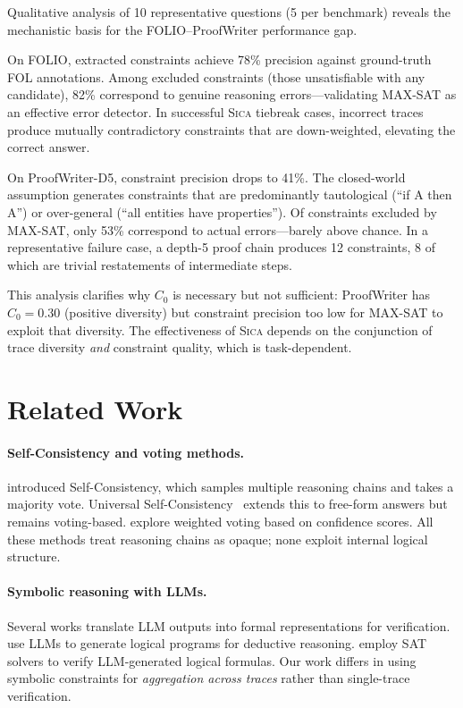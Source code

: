 \documentclass[11pt,a4paper]{article}
\newcommand{\sica}{\textsc{Sica}}
\begin{document}
Qualitative analysis of 10 representative questions (5 per benchmark) reveals the mechanistic basis for the FOLIO--ProofWriter performance gap.

On FOLIO, extracted constraints achieve 78\% precision against ground-truth FOL annotations.
Among excluded constraints (those unsatisfiable with any candidate), 82\% correspond to genuine reasoning errors---validating MAX-SAT as an effective error detector.
In successful \sica{} tiebreak cases, incorrect traces produce mutually contradictory constraints that are down-weighted, elevating the correct answer.

On ProofWriter-D5, constraint precision drops to 41\%.
The closed-world assumption generates constraints that are predominantly tautological (``if A then A'') or over-general (``all entities have properties'').
Of constraints excluded by MAX-SAT, only 53\% correspond to actual errors---barely above chance.
In a representative failure case, a depth-5 proof chain produces 12 constraints, 8 of which are trivial restatements of intermediate steps.

This analysis clarifies why $C_0$ is necessary but not sufficient: ProofWriter has $C_0 = 0.30$ (positive diversity) but constraint precision too low for MAX-SAT to exploit that diversity.
The effectiveness of \sica{} depends on the conjunction of trace diversity \emph{and} constraint quality, which is task-dependent.

\section{Related Work}
\label{sec:related}

\paragraph{Self-Consistency and voting methods.}
\citet{wang2023selfconsistency} introduced Self-Consistency, which samples multiple reasoning chains and takes a majority vote.
Universal Self-Consistency~\citep{chen2023universal} extends this to free-form answers but remains voting-based.
\citet{li2023making} explore weighted voting based on confidence scores.
All these methods treat reasoning chains as opaque; none exploit internal logical structure.

\paragraph{Symbolic reasoning with LLMs.}
Several works translate LLM outputs into formal representations for verification.
\citet{pan2023logicllm} use LLMs to generate logical programs for deductive reasoning.
\citet{ye2023satlm} employ SAT solvers to verify LLM-generated logical formulas.
Our work differs in using symbolic constraints for \emph{aggregation across traces} rather than single-trace verification.
\end{document}

